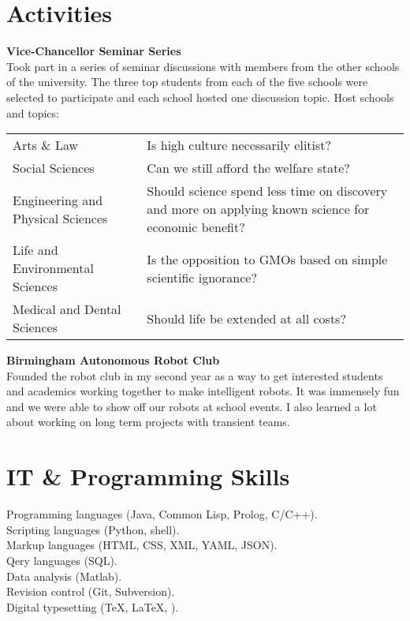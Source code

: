 \documentclass[10pt, a4paper]{article}
\newcommand{\years}[1]{\marginnote{\scriptsize #1}}
\begin{document}
\section*{Activities}
\years{2011--2012}\textbf{Vice-Chancellor Seminar Series}\\[.2cm]
Took part in a series of seminar discussions with members from the
other schools of the university. The three top students from each of
the five schools were selected to participate and each school hosted
one discussion topic. Host schools and topics:\\[.1cm]
\small{
  \begin{tabular}{l p{8cm}}
    \hspace{.5cm}Arts \& Law & Is high culture necessarily elitist?\\
    \hspace{.5cm}Social Sciences & Can we still afford the welfare state?\\
    \hspace{.5cm}Engineering and Physical Sciences & Should science spend less time on discovery and more on applying known science for economic benefit?\\
    \hspace{.5cm}Life and Environmental Sciences & Is the opposition to GMOs based on simple scientific ignorance?\\
    \hspace{.5cm}Medical and Dental Sciences & Should life be extended at all costs?
  \end{tabular}
}
\vspace{.3cm}

\years{2010--2012}\textbf{Birmingham Autonomous Robot Club}\\[.2cm]
Founded the robot club in my second year as a way to get interested
students and academics working together to make intelligent robots. It
was immensely fun and we were able to show off our robots at school
events. I also learned a lot about working on long term projects with
transient teams.

\section*{IT \& Programming Skills}
Programming languages (Java, Common Lisp, Prolog, C/C++).\\
Scripting languages (Python, shell).\\
Markup languages (HTML, CSS, XML, YAML, JSON).\\
Qery languages (SQL).\\
Data analysis (Matlab).\\
Revision control (Git, Subversion).\\
Digital typesetting (\TeX, \LaTeX, \XeTeX).
\end{document}
